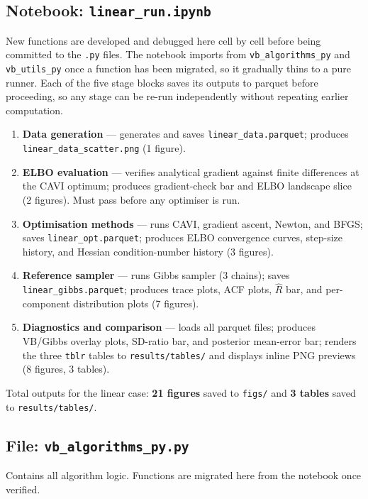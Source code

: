 \documentclass[11pt,a4paper]{article}
\begin{document}
\subsection*{Notebook: \texttt{linear\_run.ipynb}}

New functions are developed and debugged here cell by cell before being committed to the
\texttt{.py} files. The notebook imports from \texttt{vb\_algorithms\_py} and
\texttt{vb\_utils\_py} once a function has been migrated, so it gradually thins to a pure
runner. Each of the five stage blocks saves its outputs to parquet before proceeding, so any
stage can be re-run independently without repeating earlier computation.

\begin{enumerate}
  \item \textbf{Data generation} — generates and saves \texttt{linear\_data.parquet}; produces \texttt{linear\_data\_scatter.png} (1 figure).
  \item \textbf{ELBO evaluation} — verifies analytical gradient against finite differences at the CAVI optimum; produces gradient-check bar and ELBO landscape slice (2 figures). Must pass before any optimiser is run.
  \item \textbf{Optimisation methods} — runs CAVI, gradient ascent, Newton, and BFGS; saves \texttt{linear\_opt.parquet}; produces ELBO convergence curves, step-size history, and Hessian condition-number history (3 figures).
  \item \textbf{Reference sampler} — runs Gibbs sampler (3 chains); saves \texttt{linear\_gibbs.parquet}; produces trace plots, ACF plots, $\hat{R}$ bar, and per-component distribution plots (7 figures).
  \item \textbf{Diagnostics and comparison} — loads all parquet files; produces VB/Gibbs overlay plots, SD-ratio bar, and posterior mean-error bar; renders the three \texttt{tblr} tables to \texttt{results/tables/} and displays inline PNG previews (8 figures, 3 tables).
\end{enumerate}

\noindent Total outputs for the linear case: \textbf{21 figures} saved to \texttt{figs/} and \textbf{3 tables} saved to \texttt{results/tables/}.

\subsection*{File: \texttt{vb\_algorithms\_py.py}}

Contains all algorithm logic. Functions are migrated here from the notebook once verified.
\end{document}
